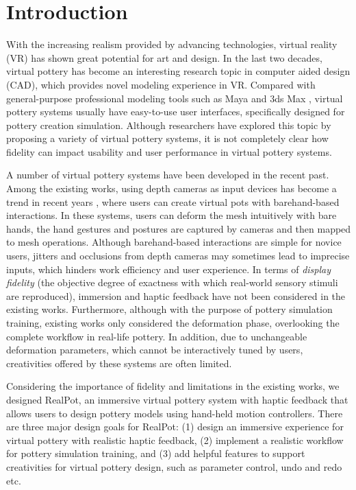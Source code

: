 \documentclass{svjour3}                     %
\begin{document}
{\color{blue}


\section{Introduction}
\label{sec:intro}

With the increasing realism provided by advancing technologies, virtual reality (VR) has shown great potential for art and design.
%
In the last two decades, virtual pottery has become an interesting research topic in computer aided design (CAD), which provides novel modeling experience in VR.
%
Compared with general-purpose professional modeling tools such as Maya \cite{website:maya} and 3ds Max \cite{website:3dmax}, virtual pottery systems usually have easy-to-use user interfaces, specifically designed for pottery creation simulation.
%
Although researchers have explored this topic by proposing a variety of virtual pottery systems, it is not completely clear how fidelity can impact usability and user performance in virtual pottery systems.

A number of virtual pottery systems have been developed in the recent past.
%
Among the existing works, using depth cameras as input devices has become a trend in recent years \cite{ramani2015gesture,murugappan2013handy,han2014virtual,gao2018digiclay} , where users can create virtual pots with barehand-based interactions.
%
In these systems, users can deform the mesh intuitively with bare hands, the hand gestures and postures are captured by cameras and then mapped to mesh operations.
Although barehand-based interactions are simple for novice users, jitters and occlusions from depth cameras may sometimes lead to imprecise inputs, which hinders work efficiency and user experience.
%
In terms of \textit{display fidelity} (the objective degree of exactness with which real-world sensory stimuli are reproduced), immersion and haptic feedback have not been considered in the existing works.
%
Furthermore, although with the purpose of pottery simulation training, existing works only considered the deformation phase, overlooking the complete workflow in real-life pottery.
%
In addition, due to unchangeable deformation parameters, which cannot be interactively tuned by users, creativities offered by these systems are often limited.

Considering the importance of fidelity and limitations in the existing works, we designed RealPot, an immersive virtual pottery system with haptic feedback that allows users to design pottery models using hand-held motion controllers.
%
There are three major design goals for RealPot:
%
(1) design an immersive experience for virtual pottery with realistic haptic feedback,
%
(2) implement a realistic workflow for pottery simulation training, 
%
and (3) add helpful features to support creativities for virtual pottery design, such as parameter control, undo and redo etc. 

}
\end{document}
